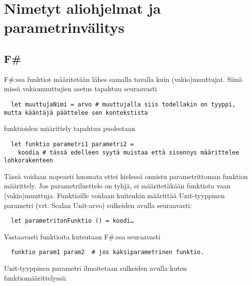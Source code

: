 



\section{Nimetyt aliohjelmat ja parametrinvälitys}

\subsection{F\#}

\lstset{
	language=FSharp,
	basicstyle=\ttfamily,
	breaklines=true,
	columns=fullflexible
}

F\#:ssa funktiot määritetään lähes samalla tavalla kuin (vakio)muuttujat. Siinä missä vakiomuuttujien asetus tapahtuu seuraavasti
 
 
\begin{lstlisting} 
  let muuttujaNimi = arvo # muuttujalla siis todellakin on tyyppi, mutta kääntäjä päättelee sen kontekstista
\end{lstlisting}

funktioiden määrittely tapahtuu puolestaan

\begin{lstlisting}
  let funktio parametri1 parametri2 =
    koodia # tässä edelleen syytä muistaa että sisennys määrittelee lohkorakenteen
\end{lstlisting}

Tässä voidaan nopeasti huomata ettei kielessä onnistu parametrittoman funktion määrittely. Jos parametriluettelo on tyhjä, ei määritetäkään funktiota vaan (vakio)muuttuja. Funktioille voidaan kuitenkin määrittää Unit-tyyppinen parametri (vrt. Scalan Unit-arvo) sulkeiden avulla seuraavasti:

\begin{lstlisting}
  let parametritonFunktio () = koodi…
\end{lstlisting}

Vastaavasti funktioita kutsutaan F\#:ssa seuraavasti

\begin{lstlisting}
  funktio param1 param2  # jos kaksiparametrinen funktio.
\end{lstlisting}


Unit-tyyppinen parametri ilmoitetaan sulkeiden avulla kuten funktiomäärittelyssä:

